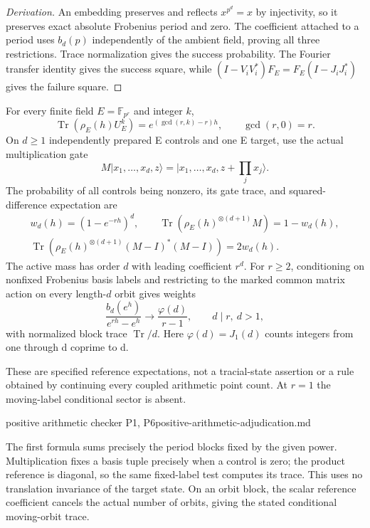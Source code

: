 \begin{proof}[Derivation]
An embedding preserves and reflects $x^{p^d}=x$ by injectivity, so it
preserves exact absolute Frobenius period and zero. The coefficient attached
to a period uses $b_d(p)$ independently of the ambient field, proving all
three restrictions. Trace normalization gives the success probability.
The Fourier transfer identity gives the success square, while
$(I-V_iV_i^*)F_E=F_E(I-J_iJ_i^*)$ gives the failure square.
\end{proof}

\begin{proposition}
\statusProved\quad
For every finite field $E=\mathbb F_{p^r}$ and integer $k$,
\[
 \operatorname{Tr}(\rho_E(h)U_E^k)=e^{(\gcd(r,k)-r)h},
 \qquad \gcd(r,0)=r.
\]
On $d\geq1$ independently prepared E controls and one E target, use the
actual multiplication gate
\[
 M|x_1,\ldots,x_d,z\rangle=|x_1,\ldots,x_d,z+\textstyle\prod_jx_j\rangle.
\]
The probability of all controls being
nonzero, its gate trace, and squared-difference expectation are
\begin{gather*}
 w_d(h)=(1-e^{-rh})^d,\qquad
 \operatorname{Tr}(\rho_E(h)^{\otimes(d+1)}M)=1-w_d(h),\\
 \operatorname{Tr}(\rho_E(h)^{\otimes(d+1)}(M-I)^*(M-I))=2w_d(h).
\end{gather*}
The active mass has order $d$ with leading coefficient $r^d$.
For $r\geq2$, conditioning on nonfixed Frobenius basis labels and
restricting to the marked common matrix action on every length-$d$ orbit
gives weights
\[
 \frac{b_d(e^h)}{e^{rh}-e^h}\longrightarrow\frac{\varphi(d)}{r-1},
 \qquad d\mid r,\ d>1,
\]
with normalized block trace $\operatorname{Tr}/d$. Here
$\varphi(d)=J_1(d)$ counts integers from one through d coprime to d.
\end{proposition}
\begin{scope}
These are specified reference expectations, not a tracial-state assertion
or a rule obtained by continuing every coupled arithmetic point count.
At $r=1$ the moving-label conditional sector is absent.
\end{scope}
{positive arithmetic checker P1, P6}{positive-arithmetic-adjudication.md}

The first formula sums precisely the period blocks fixed by the given
power. Multiplication fixes a basis tuple precisely when a control is zero;
the product reference is diagonal, so the same fixed-label test computes
its trace. This uses no translation invariance of the target state.
On an orbit block, the scalar reference coefficient cancels the actual
number of orbits, giving the stated conditional moving-orbit trace.

